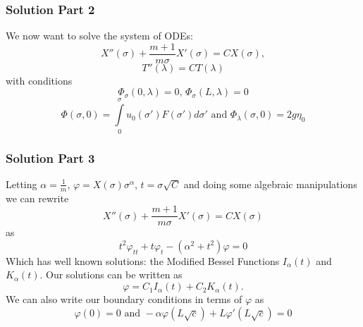 	
	
	\begin{frame}
		\frametitle{Solution Part 2}
		 We now want to solve the system of ODEs:
		\[X''(\sigma)+\frac{m+1}{m\sigma}X'(\sigma)=C X(\sigma),\]
		\[T''(\lambda)=CT(\lambda)\]
		with conditions
		\[\Phi_\sigma (0,\lambda)=0\text{, }\Phi_\sigma (L,\lambda)=0\]
		\[ \Phi(\sigma,0)=\int\limits_0^\sigma u_0(\sigma ')F(\sigma ')d \sigma'\text{ and }\Phi_\lambda(\sigma,0)=2g\eta_0\]
	\end{frame}
	
	
	
	
		\begin{frame}
		\frametitle{Solution Part 3}
		 Letting $\alpha=\frac 1m$, $\varphi=X(\sigma)\sigma ^\alpha$, $t=\sigma \sqrt{C}$ and doing some algebraic manipulations we can rewrite 
		\[X''(\sigma)+\frac{m+1}{m\sigma}X'(\sigma)=C X(\sigma)\]
		as
		\[t^2 \varphi_{tt}+t \varphi_t-(\alpha^2+t^2)\varphi=0\]
		Which has well known solutions: the Modified Bessel Functions $I_\alpha(t)$ and $K_\alpha(t)$. Our solutions can be written as $$\varphi=C_1I_\alpha(t)+C_2K_\alpha(t).$$ We can also write our boundary conditions in terms of $\varphi$ as 
		\[\varphi(0)=0\text{ and }-\alpha\varphi(L\sqrt{c})+L\varphi'(L\sqrt{c})=0\]
	\end{frame}
	
